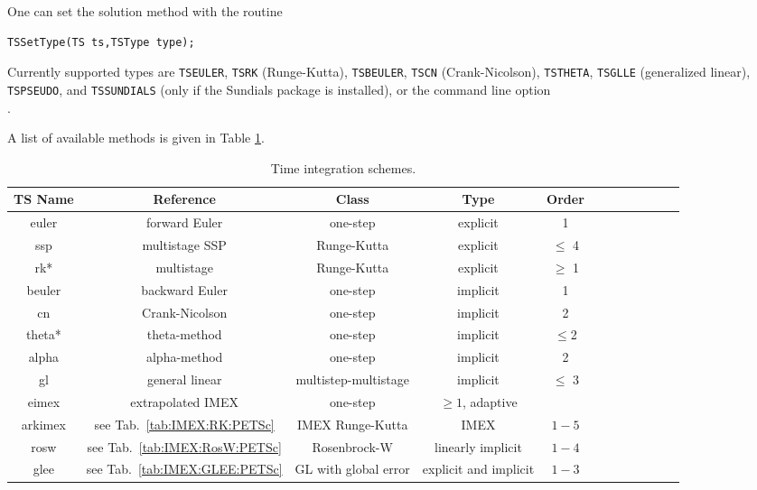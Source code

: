 \noindent One can set the solution method with the routine
\begin{lstlisting}
TSSetType(TS ts,TSType type);
\end{lstlisting}
Currently supported types are \lstinline{TSEULER}, \lstinline{TSRK} (Runge-Kutta), 
\lstinline{TSBEULER}, \lstinline{TSCN} (Crank-Nicolson), \lstinline{TSTHETA}, \lstinline{TSGLLE} (generalized linear), \lstinline{TSPSEUDO}, and  
\lstinline{TSSUNDIALS} (only if the Sundials package is installed),  
or the command line option \\
.
 

A list of available methods is given in Table \ref{tab:TSPET}.

%
\begin{table}
\caption{Time integration schemes.}
\centering
\begin{tabular}{|c|c|c|c|c|c|c|c|c|c|c|c|}
\hline
{\bf TS Name}&{\bf Reference}&{\bf Class}& {\bf Type}&{\bf Order}\\
\hline
euler&forward Euler&one-step&explicit&1\\
\hline
ssp&multistage SSP \cite{Ketcheson_2008}&Runge-Kutta&explicit&$\le$ 4\\
\hline
rk*&multistage&Runge-Kutta&explicit&$\ge$ 1\\
\hline
beuler&backward Euler&one-step&implicit&1\\
\hline
cn&Crank-Nicolson&one-step&implicit&2\\
\hline
theta*&theta-method&one-step&implicit&$\le$2\\
\hline
alpha&alpha-method \cite{Jansen_2000}&one-step&implicit&2\\
\hline
gl&general linear
\cite{Butcher_2007}&multistep-multistage&implicit& $\le$ 3\\
\hline
eimex&extrapolated IMEX \cite{Constantinescu_A2010a}&one-step&$\ge
1$, adaptive&\\
\hline
arkimex&  see Tab.\ \ref{tab:IMEX:RK:PETSc}& IMEX Runge-Kutta & IMEX& $1-5$\\
\hline
rosw& see Tab.\ \ref{tab:IMEX:RosW:PETSc} &Rosenbrock-W &linearly
implicit&$1-4$\\ \hline
glee& see Tab.\ \ref{tab:IMEX:GLEE:PETSc} &GL with global
error&explicit and implicit&$1-3$\\
\hline
\end{tabular}%
\label{tab:TSPET}
\end{table}
%




